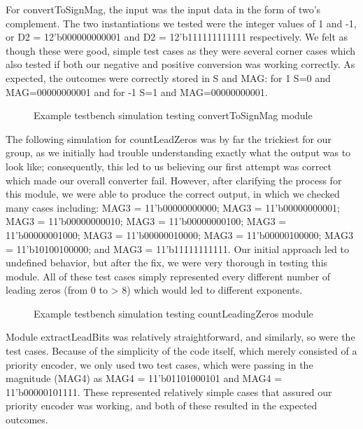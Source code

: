 \documentclass{article}
\begin{document}
For convertToSignMag, the input was the input data in the form of two's complement.  The two instantiations we tested were the integer values of 1 and -1, or D2 = 12'b000000000001 and D2 = 12'b111111111111 respectively.  We felt as though these were good, simple test cases as they were several corner cases which also tested if both our negative and positive conversion was working correctly.  As expected, the outcomes were correctly stored in S and MAG: for 1 S=0 and MAG=00000000001 and for -1 S=1 and MAG=00000000001.     

\begin{figure}[H]
	\begin{center}
		\caption{Example testbench simulation testing convertToSignMag module}
	\end{center}
\end{figure}

The following simulation for countLeadZeros was by far the trickiest for our group, as we initially had trouble understanding exactly what the output was to look like; consequently, this led to us believing our first attempt was correct which made our overall converter fail.  However, after clarifying the process for this module, we were able to produce the correct output, in which we checked many cases including: MAG3 = 11'b00000000000; MAG3 = 11'b00000000001; MAG3 = 11'b00000000010; MAG3 = 11'b00000000100; MAG3 = 11'b00000001000; MAG3 = 11'b00000010000; MAG3 = 11'b00000100000; MAG3 = 11'b10100100000; and MAG3 = 11'b11111111111.  Our initial approach led to undefined behavior, but after the fix, we were very thorough in testing this module.  All of these test cases simply represented every different number of leading zeros (from 0 to > 8) which would led to different exponents.

\begin{figure}[H]
	\begin{center}
		\caption{Example testbench simulation testing countLeadingZeros module}
	\end{center}
\end{figure}

Module extractLeadBits was relatively straightforward, and similarly, so were the test cases.  Because of the simplicity of the code itself, which merely consisted of a priority encoder, we only used two test cases, which were passing in the magnitude (MAG4) as MAG4 = 11'b01101000101 and MAG4 = 11'b00000101111.  These represented relatively simple cases that assured our priority encoder was working, and both of these resulted in the expected outcomes.
\end{document}
